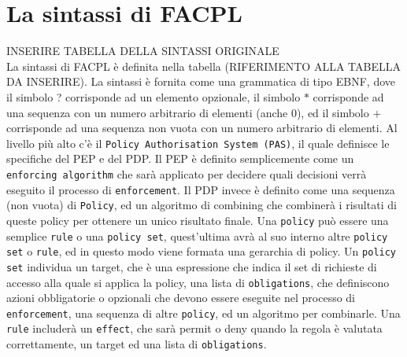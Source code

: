 \section{La sintassi di FACPL}
INSERIRE TABELLA DELLA SINTASSI ORIGINALE \\

La sintassi di FACPL è definita nella tabella (RIFERIMENTO ALLA TABELLA DA INSERIRE).
La sintassi è fornita come una grammatica di tipo EBNF, dove il simbolo ? corrisponde ad un elemento opzionale, il simbolo $*$ corrisponde ad una sequenza con un numero arbitrario di elementi (anche 0), ed il simbolo $+$ corrisponde ad una sequenza non vuota con un numero arbitrario di elementi.
Al livello più alto c'è il \texttt{Policy Authorisation System (PAS)}, il quale definisce le specifiche del PEP e del PDP.
Il PEP è definito semplicemente come un \texttt{enforcing algorithm} che sarà applicato per decidere quali decisioni verrà eseguito il processo di \texttt{enforcement}. 
Il PDP invece è definito come una sequenza (non vuota) di \texttt{Policy}, ed un algoritmo di combining che combinerà i risultati di queste policy per ottenere un unico risultato finale.
Una \texttt{policy} può essere una semplice \texttt{rule} o una \texttt{policy set}, quest'ultima avrà al suo interno altre \texttt{policy set} o \texttt{rule}, ed in questo modo viene formata una gerarchia di policy.
Un \texttt{policy set} individua un target, che è una espressione che indica il set di richieste di accesso alla quale si applica la policy, una lista di \texttt{obligations}, che definiscono azioni obbligatorie o opzionali che devono essere eseguite nel processo di \texttt{enforcement}, una sequenza di altre \texttt{policy}, ed un algoritmo per combinarle.
Una \texttt{rule} includerà un \texttt{effect}, che sarà permit o deny quando la regola è valutata correttamente, un target ed una lista di \texttt{obligations}.

